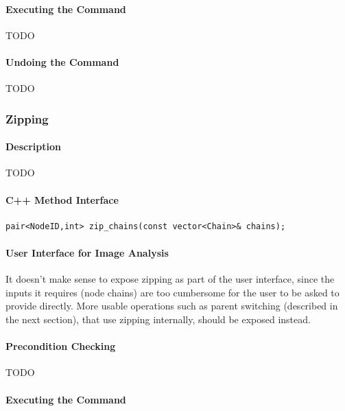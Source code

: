 \paragraph{Executing the Command}

TODO

\paragraph{Undoing the Command}

TODO

\subsubsection{Zipping}

\paragraph{Description}

TODO

\paragraph{C++ Method Interface}

\begin{lstlisting}[style=Prototype]
pair<NodeID,int> zip_chains(const vector<Chain>& chains);
\end{lstlisting}

\paragraph{User Interface for Image Analysis}

It doesn't make sense to expose zipping as part of the user interface, since the inputs it requires (node chains) are too cumbersome for the user to be asked to provide directly. More usable operations such as parent switching (described in the next section), that use zipping internally, should be exposed instead.

\paragraph{Precondition Checking}

TODO

\paragraph{Executing the Command}

